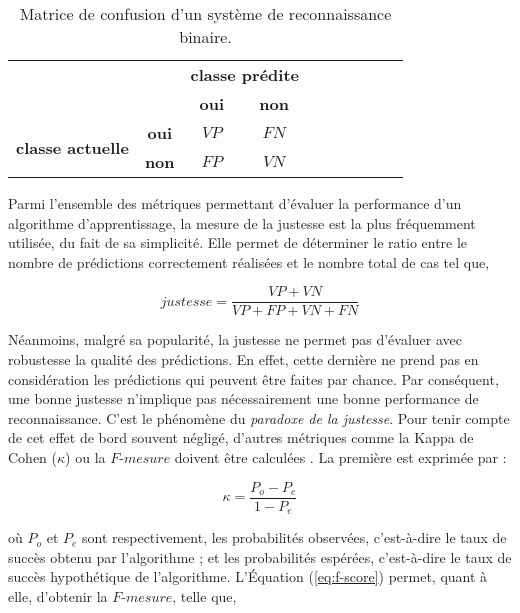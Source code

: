 \begin{table}[H]
	\begin{center}
		\caption{Matrice de confusion d'un système de reconnaissance binaire.}
		\label{tab:conf_mat}
		\begin{tabular}{llllllllll}
			\cline{3-4}
			& \multicolumn{1}{l|}{} & \multicolumn{2}{c|}{\textbf{classe prédite}} \\ \cline{3-4}
	        & \multicolumn{1}{l|}{} & \multicolumn{1}{c|}{\textbf{oui}} & \multicolumn{1}{c|}{\textbf{non}} \\ \cline{1-4}
			\multicolumn{1}{|c|}{\multirow{2}{*}{\textbf{classe actuelle}}} & \multicolumn{1}{c|}{\textbf{oui}} & \multicolumn{1}{c|}{$VP$} & \multicolumn{1}{c|}{$FN$} \\ \cline{2-4}
			\multicolumn{1}{|c|}{} & \multicolumn{1}{c|}{\textbf{non}} & \multicolumn{1}{c|}{$FP$} & \multicolumn{1}{c|}{$VN$} \\ \cline{1-4}
		\end{tabular}
	\end{center}
\end{table}

Parmi l'ensemble des métriques permettant d'évaluer la performance d'un algorithme d'apprentissage, la mesure de la justesse est la plus fréquemment utilisée, du fait de sa simplicité. Elle permet de déterminer le ratio entre le nombre de prédictions correctement réalisées et le nombre total de cas tel que,

\begin{equation}
	justesse = \frac{VP+VN}{VP+FP+VN+FN}
\end{equation}

Néanmoins, malgré sa popularité, la justesse ne permet pas d'évaluer avec robustesse la qualité des prédictions. En effet, cette dernière ne prend pas en considération les prédictions qui peuvent être faites par chance. Par conséquent, une bonne justesse n'implique pas nécessairement une bonne performance de reconnaissance. C'est le phénomène du \textit{paradoxe de la justesse}. Pour tenir compte de cet effet de bord souvent négligé, d'autres métriques comme la Kappa de Cohen ($\kappa$) ou la $F\mbox{-} mesure$ doivent être calculées \citep{Ben-David2007a}. La première est exprimée par :

\begin{equation}
	\label{eq:kappa}
	\kappa = \frac{P_o - P_e}{1 - P_e}
\end{equation}

\noindent où $P_o$ et $P_e$ sont respectivement, les probabilités observées, c'est-à-dire le taux de succès obtenu par l'algorithme ; et les probabilités espérées, c'est-à-dire le taux de succès hypothétique de l'algorithme. L'Équation (\ref{eq:f-score}) permet, quant à elle, d'obtenir la $F\mbox{-} mesure$, telle que,

